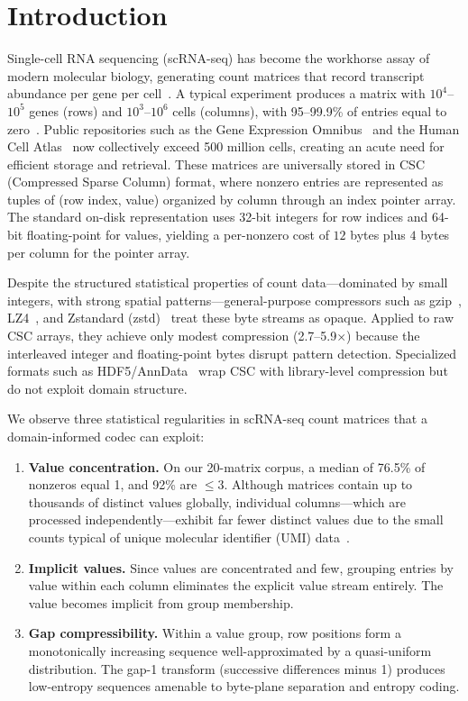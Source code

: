 \documentclass[10pt,twocolumn,letterpaper]{article}
\begin{document}
\section{Introduction}

Single-cell RNA sequencing (scRNA-seq) has become the workhorse assay of modern molecular biology, generating count matrices that record transcript abundance per gene per cell~\cite{zheng2017massively,svensson2018exponential}.
A typical experiment produces a matrix with $10^4$--$10^5$ genes (rows) and $10^3$--$10^6$ cells (columns), with 95--99.9\% of entries equal to zero~\cite{bacher2016design}.
Public repositories such as the Gene Expression Omnibus~\cite{edgar2002gene} and the Human Cell Atlas~\cite{regev2017human} now collectively exceed 500 million cells, creating an acute need for efficient storage and retrieval.
These matrices are universally stored in CSC (Compressed Sparse Column) format, where nonzero entries are represented as tuples of (row index, value) organized by column through an index pointer array.
The standard on-disk representation uses 32-bit integers for row indices and 64-bit floating-point for values, yielding a per-nonzero cost of $12$ bytes plus $4$ bytes per column for the pointer array.

Despite the structured statistical properties of count data---dominated by small integers, with strong spatial patterns---general-purpose compressors such as gzip~\cite{deutsch1996gzip}, LZ4~\cite{collet2013lz4}, and Zstandard (zstd)~\cite{collet2018zstandard} treat these byte streams as opaque.
Applied to raw CSC arrays, they achieve only modest compression (2.7--5.9$\times$) because the interleaved integer and floating-point bytes disrupt pattern detection.
Specialized formats such as HDF5/AnnData~\cite{anndata,folk2011overview} wrap CSC with library-level compression but do not exploit domain structure.

We observe three statistical regularities in scRNA-seq count matrices that a domain-informed codec can exploit:

\begin{enumerate}
\item \textbf{Value concentration.} On our 20-matrix corpus, a median of 76.5\% of nonzeros equal 1, and 92\% are $\leq 3$. Although matrices contain up to thousands of distinct values globally, individual columns---which are processed independently---exhibit far fewer distinct values due to the small counts typical of unique molecular identifier (UMI) data~\cite{islam2014quantitative}.
\item \textbf{Implicit values.} Since values are concentrated and few, grouping entries by value within each column eliminates the explicit value stream entirely. The value becomes implicit from group membership.
\item \textbf{Gap compressibility.} Within a value group, row positions form a monotonically increasing sequence well-approximated by a quasi-uniform distribution. The gap-1 transform (successive differences minus 1) produces low-entropy sequences amenable to byte-plane separation and entropy coding.
\end{enumerate}
\end{document}

